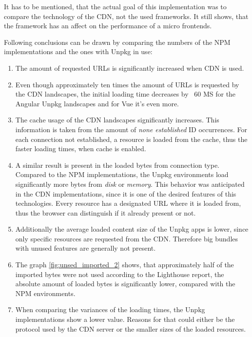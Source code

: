 It has to be mentioned, that the actual goal of this implementation was to compare the technology of the CDN, not the used frameworks. It still shows, that the framework has an affect on the performance of a micro frontends. 

Following conclusions can be drawn by comparing the numbers of the NPM implementations and the ones with Unpkg in use:

\begin{enumerate}
	\item The amount of requested URLs is significantly increased when CDN is used.
	\item Even though approximately ten times the amount of URLs is requested by the CDN landscapes, the initial loading time decreases by ~60 MS for the Angular Unpkg landscapes and for Vue it's even more.
	\item The cache usage of the CDN landscapes significantly increases. This information is taken from the amount of \textit{none established} ID occurrences. For each connection not established, a resource is loaded from the cache, thus the faster loading times, when cache is enabled.
	\item A similar result is present in the loaded bytes from connection type. Compared to the NPM implementations, the Unpkg environments load significantly more bytes from \textit{disk} or \textit{memory}. This behavior was anticipated in the CDN implementations, since it is one of the desired features of this technologies. Every resource has a designated URL where it is loaded from, thus the browser can distinguish if it already present or not.
	\item Additionally the average loaded content size of the Unpkg apps is lower, since only specific resources are requested from the CDN. Therefore big bundles with unused features are generally not present.
	\item The graph \ref{fig:unsed_imported_2} shows, that approximately half of the imported bytes were not used according to the Lighthouse report, the absolute amount of loaded bytes is significantly lower, compared with the NPM environments.
	\item When comparing the variances of the loading times, the Unpkg implementations show a lower value. Reasons for that could either be the protocol used by the CDN server or the smaller sizes of the loaded resources.
\end{enumerate}

